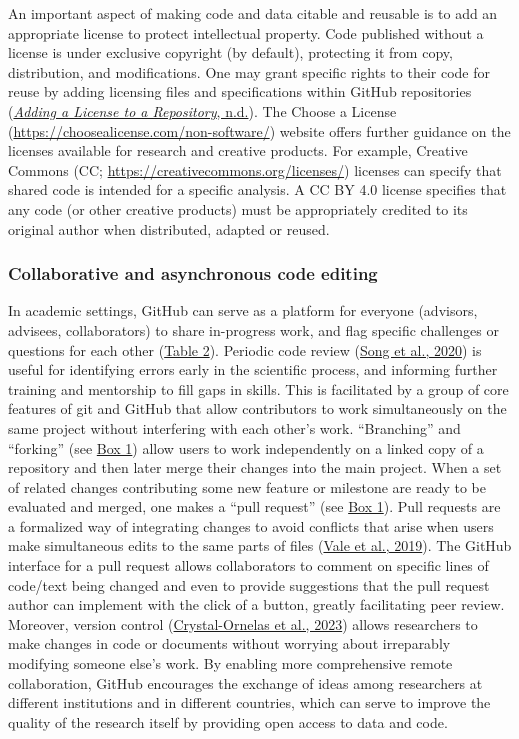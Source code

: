 An important aspect of making code and data citable and reusable is to add an appropriate license to protect intellectual property.
Code published without a license is under exclusive copyright (by default), protecting it from copy, distribution, and modifications.
One may grant specific rights to their code for reuse by adding licensing files and specifications within GitHub repositories (\protect\hyperlink{ref-TOsASkn5}{\emph{Adding a License to a Repository}, n.d.}).
The Choose a License (\url{https://choosealicense.com/non-software/}) website offers further guidance on the licenses available for research and creative products.
For example, Creative Commons (CC; \url{https://creativecommons.org/licenses/}) licenses can specify that shared code is intended for a specific analysis.
A CC BY 4.0 license specifies that any code (or other creative products) must be appropriately credited to its original author when distributed, adapted or reused.

\hypertarget{code-editing}{%
\subsubsection{Collaborative and asynchronous code editing}\label{code-editing}}

In academic settings, GitHub can serve as a platform for everyone (advisors, advisees, collaborators) to share in-progress work, and flag specific challenges or questions for each other (\protect\hyperlink{tbl:roles}{Table 2}).
Periodic code review (\protect\hyperlink{ref-hm9PaCLD}{Song et al., 2020}) is useful for identifying errors early in the scientific process, and informing further training and mentorship to fill gaps in skills.
This is facilitated by a group of core features of git and GitHub that allow contributors to work simultaneously on the same project without interfering with each other's work.
``Branching'' and ``forking'' (see \protect\hyperlink{definitions}{Box 1}) allow users to work independently on a linked copy of a repository and then later merge their changes into the main project.
When a set of related changes contributing some new feature or milestone are ready to be evaluated and merged, one makes a ``pull request'' (see \protect\hyperlink{definitions}{Box 1}).
Pull requests are a formalized way of integrating changes to avoid conflicts that arise when users make simultaneous edits to the same parts of files (\protect\hyperlink{ref-1BJcvyTmV}{Vale et al., 2019}).
The GitHub interface for a pull request allows collaborators to comment on specific lines of code/text being changed and even to provide suggestions that the pull request author can implement with the click of a button, greatly facilitating peer review.
Moreover, version control (\protect\hyperlink{ref-K7nbP1Ty}{Crystal-Ornelas et al., 2023}) allows researchers to make changes in code or documents without worrying about irreparably modifying someone else's work.
By enabling more comprehensive remote collaboration, GitHub encourages the exchange of ideas among researchers at different institutions and in different countries, which can serve to improve the quality of the research itself by providing open access to data and code.

